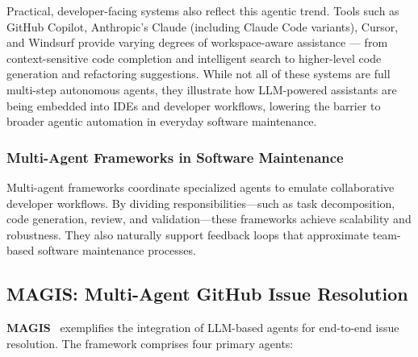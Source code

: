 Practical, developer-facing systems also reflect this agentic trend. Tools such as GitHub Copilot, Anthropic's Claude (including Claude Code variants), Cursor, and Windsurf provide varying degrees of workspace-aware assistance — from context-sensitive code completion and intelligent search to higher-level code generation and refactoring suggestions. While not all of these systems are full multi-step autonomous agents, they illustrate how LLM-powered assistants are being embedded into IDEs and developer workflows, lowering the barrier to broader agentic automation in everyday software maintenance.

\subsubsection*{Multi-Agent Frameworks in Software Maintenance}
Multi-agent frameworks coordinate specialized agents to emulate collaborative developer workflows. By dividing responsibilities—such as task decomposition, code generation, review, and validation—these frameworks achieve scalability and robustness. They also naturally support feedback loops that approximate team-based software maintenance processes.

\subsection{MAGIS: Multi-Agent GitHub Issue Resolution}
\textbf{MAGIS}~\cite{magis} exemplifies the integration of LLM-based agents for end-to-end issue resolution. The framework comprises four primary agents:

